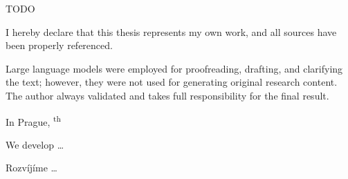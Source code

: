 \begin{thanks}
	TODO %
\end{thanks}

\begin{declaration}
	I hereby declare that this thesis represents my own work, and all sources have been properly referenced.

	Large language models were employed for proofreading, drafting, and clarifying the text; however, they were not used for generating original research content. The author always validated and takes full responsibility for the final result.

	In Prague, \textsuperscript{th}~~
\end{declaration}

\begin{abstract-english}
We develop \ldots
\end{abstract-english}

\begin{abstract-czech}
Rozvíjíme \ldots
\end{abstract-czech}
